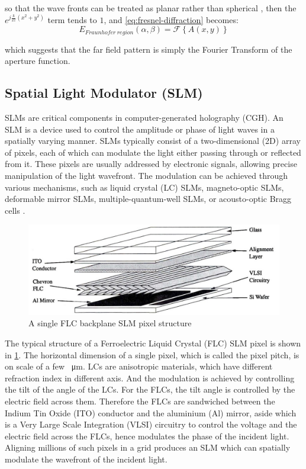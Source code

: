 so that the wave fronts can be treated as planar rather than spherical \cite{Daintith2009}, then the $e^{j\frac{k}{2z}(x^2+y^2)}$ term tends to $1$, and \cref{eq:fresnel-diffraction} becomes:
\begin{equation}
  E_{Fraunhofer\ region}(\alpha, \beta) = \mathcal{F} \left\{A(x,y)\right\}
  \label{eq:fraunhofer-diffraction}
\end{equation}

which suggests that the far field pattern is simply the Fourier Transform of the aperture function.


\subsection{Spatial Light Modulator (SLM)} \label{sec:SLM}
SLMs are critical components in computer-generated holography (CGH). An SLM is a device used to control the amplitude or phase of light waves in a spatially varying manner. SLMs typically consist of a two-dimensional (2D) array of pixels, each of which can modulate the light either passing through or reflected from it. These pixels are usually addressed by electronic signals, allowing precise manipulation of the light wavefront. The modulation can be achieved through various mechanisms, such as liquid crystal (LC) SLMs, magneto-optic SLMs, deformable mirror SLMs, multiple-quantum-well SLMs, or acousto-optic Bragg cells \cite{Goodman2017}.

\begin{figure}[H]
  \centering
  \includegraphics[width=1.0\textwidth]{SLM_pixel_structure.jpg}
  \caption{A single FLC backplane SLM pixel structure \cite{Wilkinson1994}} \label{fig:SLM_pixel_structure}
\end{figure}

The typical structure of a Ferroelectric Liquid Crystal (FLC) SLM pixel is shown in \cref{fig:SLM_pixel_structure}. The horizontal dimension of a single pixel, which is called the pixel pitch, is on scale of a few \SI{}{\micro\metre}. LCs are anisotropic materials, which have different refraction index in different axis. And the modulation is achieved by controlling the tilt of the angle of the LCs. For the FLCs, the tilt angle is controlled by the electric field across them. Therefore the FLCs are sandwiched between the Indium Tin Oxide (ITO) conductor and the aluminium (Al) mirror, aside which is a Very Large Scale Integration (VLSI) circuitry to control the voltage and the electric field across the FLCs, hence modulates the phase of the incident light. Aligning millions of such pixels in a grid produces an SLM which can spatially modulate the wavefront of the incident light.

